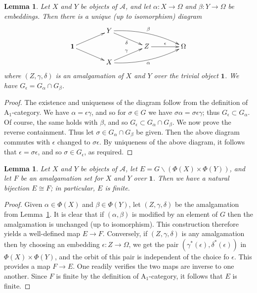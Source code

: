 \documentclass[12pt]{amsart}
\numberwithin{equation}{section}
\newtheorem{lemma}[equation]{Lemma}
\theoremstyle{definition}
\newcommand{\cA}{\mathcal{A}}
\newcommand{\rA}{\mathrm{A}}
\newcommand{\bone}{\mathbf{1}}
\begin{document}
\begin{lemma} \label{lem:fraisse1-1}
Let $X$ and $Y$ be objects of $\cA$, and let $\alpha \colon X \to \Omega$ and $\beta \colon Y \to \Omega$ be embeddings. Then there is a unique (up to isomorphism) diagram
\begin{displaymath}
\xymatrix@C=4em@R=1em{
& Y \ar[rd]_{\delta} \ar@/^8pt/[rrd]^{\beta} \\
\bone \ar[ru] \ar[rd] && Z \ar[r]^{\epsilon} & \Omega \\
& X \ar[ru]^{\gamma} \ar@/_8pt/[rru]_{\alpha} }
\end{displaymath}
where $(Z,\gamma,\delta)$ is an amalgamation of $X$ and $Y$ over the trivial object $\bone$. We have $G_{\epsilon}=G_{\alpha} \cap G_{\beta}$.
\end{lemma}

\begin{proof}
The existence and uniqueness of the diagram follow from the definition of $\rA_1$-category. We have $\alpha=\epsilon \gamma$, and so for $\sigma \in G$ we have $\sigma \alpha = \sigma \epsilon \gamma$; thus $G_{\epsilon} \subset G_{\alpha}$. Of course, the same holds with $\beta$, and so $G_{\epsilon} \subset G_{\alpha} \cap G_{\beta}$. We now prove the reverse containment. Thus let $\sigma \in G_{\alpha} \cap G_{\beta}$ be given. Then the above diagram commutes with $\epsilon$ changed to $\sigma \epsilon$. By uniqueness of the above diagram, it follows that $\epsilon=\sigma \epsilon$, and so $\sigma \in G_{\epsilon}$, as required.
\end{proof}

\begin{lemma} \label{lem:fraisse-6}
Let $X$ and $Y$ be objects of $\cA$, let $E=G \backslash (\Phi(X) \times \Phi(Y))$, and let $F$ be an amalgamation set for $X$ and $Y$ over $\bone$. Then we have a natural bijection $E \cong F$; in particular, $E$ is finite.
\end{lemma}

\begin{proof}
Given $\alpha \in \Phi(X)$ and $\beta \in \Phi(Y)$, let $(Z,\gamma,\delta)$ be the amalgamation from Lemma~\ref{lem:fraisse1-1}. It is clear that if $(\alpha,\beta)$ is modified by an element of $G$ then the amalgamation is unchanged (up to isomorphism). This construction therefore yields a well-defined map $E \to F$. Conversely, if $(Z,\gamma,\delta)$ is any amalgamation then by choosing an embedding $\epsilon \colon Z \to \Omega$, we get the pair $(\gamma^*(\epsilon), \delta^*(\epsilon))$ in $\Phi(X) \times \Phi(Y)$, and the orbit of this pair is independent of the choice fo $\epsilon$. This provides a map $F \to E$. One readily verifies the two maps are inverse to one another. Since $F$ is finite by the definition of $\rA_1$-category, it follows that $E$ is finite.
\end{proof}
\end{document}
